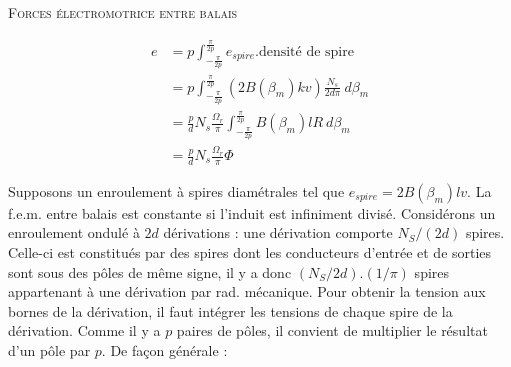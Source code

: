 		\textsc{Forces électromotrice entre balais}\ \\
		\begin{figure}
		\vspace{-2mm}
		\begin{equation}
		\begin{array}{ll}
		e &= \displaystyle p \int_{-\frac{\pi}{2p}}^{\frac{\pi}{2p}} 
		e_{spire}.\text{densité de spire}\\
		&= \displaystyle p \int_{-\frac{\pi}{2p}}^{\frac{\pi}{2p}} (
		2B(\beta_m)kv)\frac{N_s}{2d\pi}\ d\beta_m\\
		&= \displaystyle \frac{p}{d}N_s\frac{\Omega_r}{\pi} \int_{-
		\frac{\pi}{2p}}^{\frac{\pi}{2p}}B(\beta_m)lR\ d\beta_m\\
		&= \displaystyle\frac{p}{d}N_s\frac{\Omega_r}{\pi}\Phi
		\end{array}
		\end{equation}

		\end{figure}
		Supposons un enroulement à spires diamétrales tel que $e_{spire} = 
		2B(\beta_m)lv$. La f.e.m. entre balais est constante si l'induit 
		est infiniment divisé. Considérons un enroulement ondulé à $2d$ 
		dérivations : une dérivation comporte $N_S/(2d)$ spires. Celle-ci 
		est constitués par des spires dont les conducteurs d'entrée et 
		de sorties sont sous des pôles de même signe, il y a donc 
		$(N_S/2d).(1/\pi)$ spires appartenant à une dérivation par rad. 
		mécanique. Pour obtenir la tension aux bornes de la dérivation, 
		il faut intégrer les tensions de chaque spire de la dérivation. 
		Comme il y a $p$ paires de pôles, il convient de multiplier le 
		résultat d'un pôle par $p$. De façon générale :\\
		
		\ \\

